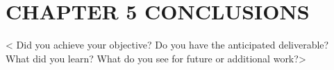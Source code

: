 \chapter[CONCLUSIONS]{\hfill CHAPTER 5 \hfill\null\vskip15pt CONCLUSIONS}

{\textless} Did you achieve your objective? Do you have the anticipated deliverable? What did you learn? What do you see for future or additional work?{\textgreater}

\clearpage